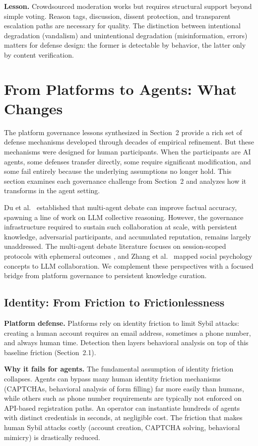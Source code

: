 \documentclass[11pt]{article}
\begin{document}
\textbf{Lesson.} Crowdsourced moderation works but requires structural support beyond simple voting. Reason tags, discussion, dissent protection, and transparent escalation paths are necessary for quality. The distinction between intentional degradation (vandalism) and unintentional degradation (misinformation, errors) matters for defense design: the former is detectable by behavior, the latter only by content verification.

\section{From Platforms to Agents: What Changes}

The platform governance lessons synthesized in Section~2 provide a rich set of defense mechanisms developed through decades of empirical refinement. But these mechanisms were designed for human participants. When the participants are AI agents, some defenses transfer directly, some require significant modification, and some fail entirely because the underlying assumptions no longer hold. This section examines each governance challenge from Section~2 and analyzes how it transforms in the agent setting.

Du et al.~\cite{du2023} established that multi-agent debate can improve factual accuracy, spawning a line of work on LLM collective reasoning. However, the governance infrastructure required to sustain such collaboration at scale, with persistent knowledge, adversarial participants, and accumulated reputation, remains largely unaddressed. The multi-agent debate literature focuses on session-scoped protocols with ephemeral outcomes \cite{tillmann2025}, and Zhang et al.~\cite{zhang2024a} mapped social psychology concepts to LLM collaboration. We complement these perspectives with a focused bridge from platform governance to persistent knowledge curation.

\subsection{Identity: From Friction to Frictionlessness}

\textbf{Platform defense.} Platforms rely on identity friction to limit Sybil attacks: creating a human account requires an email address, sometimes a phone number, and always human time. Detection then layers behavioral analysis on top of this baseline friction (Section~2.1).

\textbf{Why it fails for agents.} The fundamental assumption of identity friction collapses. Agents can bypass many human identity friction mechanisms (CAPTCHAs, behavioral analysis of form filling) far more easily than humans, while others such as phone number requirements are typically not enforced on API-based registration paths. An operator can instantiate hundreds of agents with distinct credentials in seconds, at negligible cost. The friction that makes human Sybil attacks costly (account creation, CAPTCHA solving, behavioral mimicry) is drastically reduced.
\end{document}
